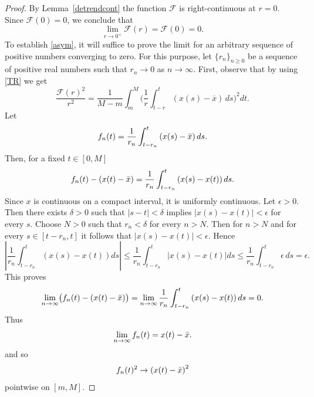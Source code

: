 \documentclass[10pt,a4paper]{amsart}
\begin{document}
\begin{proof}
By Lemma~\ref{detrendcont} the function $\mathcal F$ is right-continuous at $r=0$. Since $\mathcal F(0)=0$, we conclude that 
\begin{equation*}
    \lim_{r\to0^{+}}\mathcal{F}(r)=\mathcal{F}(0)=0.
\end{equation*}
To establish \eqref{asym}, it will suffice to prove the limit for an arbitrary sequence of positive numbers converging to zero. For this purpose, let $\{r_n\}_{n\geq 0}$ be a sequence of positive real numbers such that $r_n\to 0$ as $n\to\infty$. 
\newline
First, observe that by using \eqref{TR} we get
\[
\frac{\mathcal{F}(r)^2}{r^2}=\frac{1}{M-m}\int_{m}^{M}\biggl( \frac{1}{r}\int_{t-r}^{t}\left(x(s)-\overline{x}\right)\, ds\biggr)^2dt.
\]
Let 
\begin{equation*}
  f_n(t)=\frac{1}{r_n}\int_{t-r_n}^{t} \left(x(s)-\Bar{x}\right)ds.
\end{equation*}
Then, for a fixed $t\in[0,M]$
\begin{equation*}
    f_n(t)- \left( x(t)-\Bar{x}\right)=\frac{1}{r_n}\int_{t-r_n}^{t}\left(x(s)-x(t)\right)ds.
\end{equation*}
Since $x$ is continuous on a compact interval, it is uniformly continuous.
Let $\epsilon>0$. Then there exists $\delta>0$ such that $|s-t|<\delta$ implies $|x(s)-x(t)|<\epsilon$ for every $s$. Choose $N>0$ such that $r_n<\delta$ for every $n>N$. Then for $n>N$ and for every $s\in [t-r_n,t]$ it follows that $|x(s)-x(t)|<\epsilon.$ Hence
\begin{equation*}
   \left|\frac{1}{r_n}\int_{t-r_n}^{t}\left(x(s)-x(t)\right)ds\right|\leq \frac{1}{r_n}\int_{t-r_n}^{t}|x(s)-x(t)|ds\leq\frac{1}{r_n}\int_{t-r_n}^{t}\epsilon\, ds=\epsilon.
\end{equation*}
This proves 
\begin{equation*}
   \lim_{n\to \infty} \bigl(f_n(t)- \left( x(t)-\Bar{x}\right)\bigr)=\lim_{n\to\infty}\frac{1}{r_n}\int_{t-r_n}^{t}\left(x(s)-x(t)\right)ds=0.
\end{equation*}
Thus
\begin{equation*}
\lim_{n\to\infty}f_n(t)=x(t)-\Bar{x}.
\end{equation*}
and so
\begin{equation*}
f_n(t)^2\to\left(x(t)-\Bar{x}\right)^2  
\end{equation*}
pointwise on $[m,M].$


\end{proof}
\end{document}
